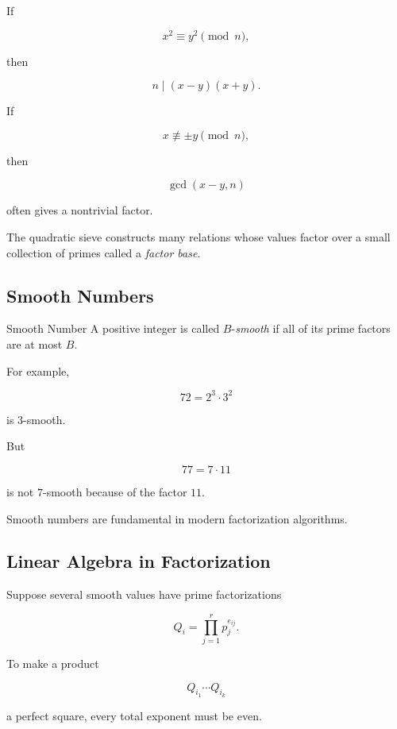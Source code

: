 If

\[ x^2\equiv y^2\pmod n, \]

then

\[ n\mid(x-y)(x+y). \]

If

\[ x\not\equiv\pm y\pmod n, \]

then

\[ \gcd(x-y,n) \]

often gives a nontrivial factor.

The quadratic sieve constructs many relations whose values factor over a
small collection of primes called a \emph{factor base}.

\subsection{Smooth Numbers}
\label{subsec:smooth-numbers}

\begin{definitionbox}{Smooth Number}
A positive integer is called \(B\)-\emph{smooth} if all of its prime factors
are at most \(B\).
\end{definitionbox}

For example,

\[ 72=2^3\cdot3^2 \]

is \(3\)-smooth.

But

\[ 77=7\cdot11 \]

is not \(7\)-smooth because of the factor \(11\).

Smooth numbers are fundamental in modern factorization algorithms.

\subsection{Linear Algebra in Factorization}
\label{subsec:factorization-linear-algebra}

Suppose several smooth values have prime factorizations

\[ Q_i=\prod_{j=1}^{r}p_j^{e_{ij}}. \]

To make a product

\[ Q_{i_1}\cdots Q_{i_k} \]

a perfect square, every total exponent must be even.

